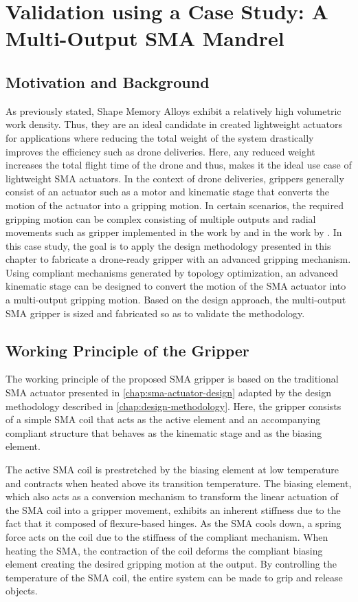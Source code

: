 \section{Validation using a Case Study: A Multi-Output SMA Mandrel}\label{sec:smacm-mandrel}
\subsection{Motivation and Background}
As previously stated, Shape Memory Alloys exhibit a relatively high volumetric work density. Thus, they are an ideal candidate in created lightweight actuators for applications where reducing the total weight of the system drastically improves the efficiency such as drone deliveries. Here, any reduced weight increases the total flight time of the drone and thus, makes it the ideal use case of lightweight SMA actuators.
In the context of drone deliveries, grippers generally consist of an actuator such as a motor and kinematic stage that converts the motion of the actuator into a gripping motion. In certain scenarios, the required gripping motion can be complex consisting of multiple outputs and radial movements such as gripper implemented in the work by \cite{leeClosedStructureCompliantGripper2021} and in the work by \cite{singhCompactCompliantExternal2013}.
In this case study, the goal is to apply the design methodology presented in this chapter to fabricate a drone-ready gripper with an advanced gripping mechanism. Using compliant mechanisms generated by topology optimization, an advanced kinematic stage can be designed to convert the motion of the SMA actuator into a multi-output gripping motion. Based on the design approach, the multi-output SMA gripper is sized and fabricated so as to validate the methodology.
\subsection{Working Principle of the Gripper}
The working principle of the proposed SMA gripper is based on the traditional SMA actuator presented in \cref{chap:sma-actuator-design} adapted by the design methodology described in \cref{chap:design-methodology}. Here, the gripper consists of a simple SMA coil that acts as the active element and an accompanying compliant structure that behaves as the kinematic stage and as the biasing element.

The active SMA coil is prestretched by the biasing element at low temperature and contracts when heated above its transition temperature. The biasing element, which also acts as a conversion mechanism to transform the linear actuation of the SMA coil into a gripper movement, exhibits an inherent stiffness due to the fact that it composed of flexure-based hinges. As the SMA cools down, a spring force acts on the coil due to the stiffness of the compliant mechanism. When heating the SMA, the contraction of the coil deforms the compliant biasing element creating the desired gripping motion at the output. By controlling the temperature of the SMA coil, the entire system can be made to grip and release objects.

